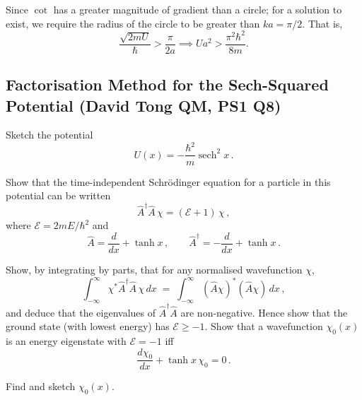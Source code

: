 Since $\cot$ has a greater magnitude of gradient than a circle; for a solution to exist, we require the radius of the circle to be greater than $ka=\pi/2$. That is,
\begin{equation}
    \frac{\sqrt{2mU}}{\hbar} > \frac{\pi}{2a} \implies Ua^2 > \frac{\pi^2\hbar^2}{8m}.
\end{equation}

\subsection{Factorisation Method for the Sech-Squared Potential (David Tong QM, PS1 Q8)}
\label{sec:sech-potential}

Sketch the potential
%
\begin{equation}
  U(x) = -\frac{\hbar^2}{m}\operatorname{sech}^2 x\,.
  \label{eq:sech-pot}
\end{equation}

Show that the time-independent Schr\"{o}dinger equation for a particle in this
potential can be written
%
\begin{equation}
  \hat{A}^\dagger \hat{A}\,\chi = (\mathcal{E}+1)\,\chi\,,
\end{equation}
%
where $\mathcal{E} = 2mE/\hbar^2$ and
%
\begin{equation}
  \hat{A} = \frac{d}{d x} + \tanh x\,,
  \qquad
  \hat{A}^\dagger = -\frac{d}{d x} + \tanh x\,.
\end{equation}

Show, by integrating by parts, that for any normalised wavefunction $\chi$,
%
\begin{equation}
  \int_{-\infty}^{\infty} \chi^*\hat{A}^\dagger\hat{A}\,\chi\,dx
  \;=\;
  \int_{-\infty}^{\infty} (\hat{A}\chi)^*(\hat{A}\chi)\,dx\,,
\end{equation}
%
and deduce that the eigenvalues of $\hat{A}^\dagger\hat{A}$ are non-negative.
Hence show that the ground state (with lowest energy) has $\mathcal{E}\geq -1$.
Show that a wavefunction $\chi_0(x)$ is an energy eigenstate with
$\mathcal{E}=-1$ iff
%
\begin{equation}
  \frac{d\chi_0}{d x} + \tanh x\,\chi_0 = 0\,.
\end{equation}

Find and sketch $\chi_0(x)$.

